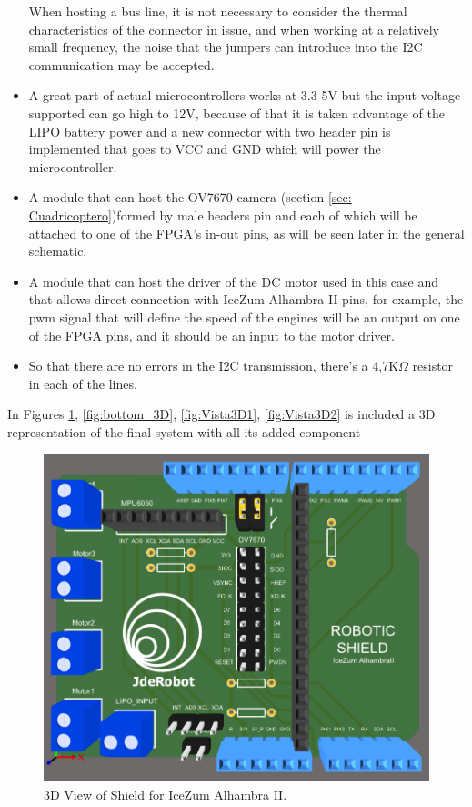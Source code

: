 \begin{itemize}
		When hosting a bus line, it is not necessary to consider the thermal characteristics of the connector in issue, and when working at a relatively small frequency, the noise that the jumpers can introduce into the I2C communication may be accepted.
		\item A great part of actual microcontrollers works at 3.3-5V but the input voltage supported can go high to 12V, because of that it is taken advantage of the LIPO battery power and a new connector with two header pin is implemented that goes to VCC and GND which will power the microcontroller.	
		\item A module that can host the OV7670 camera (section \ref{sec: Cuadricoptero})formed by male headers pin and each of which will be attached to one of the FPGA's in-out pins, as will be seen later in the general schematic.
		\item A module that can host the driver of the DC motor used in this case and that allows direct connection with IceZum Alhambra II pins, for example, the pwm signal that will define the speed of the engines will be an output on one of the FPGA pins, and it should be an input to the motor driver.
		
		\item So that there are no errors in the I2C transmission, there’s a 4,7K$\Omega$ resistor in each of the lines.
	\end{itemize}	
	In Figures \ref{fig:top_3D}, \ref{fig:bottom_3D}, \ref{fig:Vista3D1}, \ref{fig:Vista3D2} is included a 3D representation of the final system with all its added component
	
	\begin{center}
		\begin{figure}[H]
			\center
			\includegraphics[scale=0.6]{imagenes/Balancing_Robot/top_3D.PNG}
			\caption{3D View of Shield for IceZum Alhambra II.}
			\label{fig:top_3D}
		\end{figure}
	\end{center}
	
